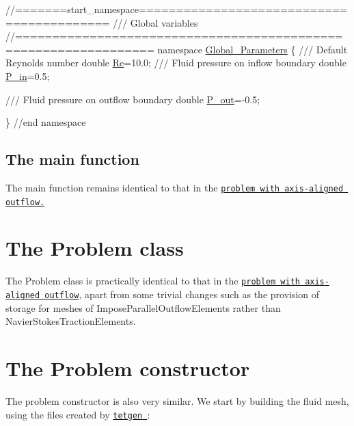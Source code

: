  
\begin{DoxyCodeInclude}
\textcolor{comment}{//=======start\_namespace==========================================}
\textcolor{comment}{/// Global variables}
\textcolor{comment}{}\textcolor{comment}{//================================================================}
\textcolor{keyword}{namespace }\hyperlink{namespaceGlobal__Parameters}{Global\_Parameters}
\{
\textcolor{comment}{}
\textcolor{comment}{ /// Default Reynolds number}
\textcolor{comment}{} \textcolor{keywordtype}{double} \hyperlink{namespaceGlobal__Parameters_a9d72e94a9305c6a310940a6a427ebe06}{Re}=10.0;
\textcolor{comment}{}
\textcolor{comment}{ /// Fluid pressure on inflow boundary}
\textcolor{comment}{} \textcolor{keywordtype}{double} \hyperlink{namespaceGlobal__Parameters_a05b26d00935600b5e0149872844f224c}{P\_in}=0.5;

\textcolor{comment}{}
\textcolor{comment}{ /// Fluid pressure on outflow boundary}
\textcolor{comment}{} \textcolor{keywordtype}{double} \hyperlink{namespaceGlobal__Parameters_ac680ed856897793d54c9c867da19169c}{P\_out}=-0.5; 
 
\} \textcolor{comment}{//end namespace}

\end{DoxyCodeInclude}




\hypertarget{index_main}{}\subsection{The main function}\label{index_main}
The main function remains identical to that in the \href{../../unstructured_three_d_fluid/html/index.html}{\tt problem with axis-\/aligned outflow.}



\hypertarget{index_class}{}\section{The Problem class}\label{index_class}
The {\ttfamily Problem} class is practically identical to that in the \href{../../unstructured_three_d_fluid/html/index.html}{\tt problem with axis-\/aligned outflow}, apart from some trivial changes such as the provision of storage for meshes of {\ttfamily Impose\+Parallel\+Outflow\+Elements} rather than {\ttfamily Navier\+Stokes\+Traction\+Elements}.



\hypertarget{index_constructor}{}\section{The Problem constructor}\label{index_constructor}
The problem constructor is also very similar. We start by building the fluid mesh, using the files created by \href{http://wias-berlin.de/software/tetgen//}{\tt {\ttfamily tetgen} }\+:


